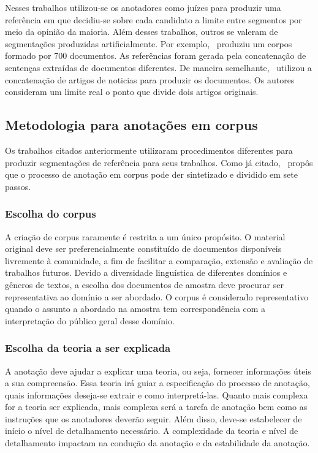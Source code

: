 Nesses trabalhos utilizou-se os anotadores como juízes para produzir uma referência em que decidiu-se sobre cada candidato a limite entre segmentos por meio da opinião da maioria. Além desses trabalhos, outros se valeram de segmentações produzidas artificialmente. Por exemplo,~\cite{Choi2000} produziu um corpos formado por 700 documentos. As referências foram gerada pela concatenação de sentenças extraídas de documentos diferentes. De maneira semelhante,~\cite{CHAIBI2014} utilizou a concatenação de artigos de noticias para produzir os documentos. Os autores consideram um limite real o ponto que divide dois artigos originais. 

\subsection{Metodologia para anotações em corpus}


Os trabalhos citados anteriormente utilizaram procedimentos diferentes para produzir segmentações de referência para seus trabalhos. Como já citado,~\cite{Hovy2010} propôs que o processo de anotação em corpus pode der sintetizado e dividido em sete passos. 


\subsubsection{Escolha do corpus}
A criação de corpus raramente é restrita a um único propósito. O material original deve ser preferencialmente constituído de documentos disponíveis livremente à comunidade, a fim de facilitar a comparação, extensão e avaliação de trabalhos futuros. 
Devido a diversidade linguística de diferentes domínios e gêneros de textos, a escolha dos documentos de amostra deve procurar ser representativa ao domínio a ser abordado. O corpus é considerado representativo quando o assunto a abordado na amostra tem correspondência com a interpretação do público geral desse domínio.

\subsubsection{Escolha da teoria a ser explicada}
A anotação deve ajudar a explicar uma teoria, ou seja, fornecer informações úteis a sua compreensão. Essa teoria irá guiar a especificação do processo de anotação, quais informações deseja-se extrair e como interpretá-las. Quanto mais complexa for a teoria ser explicada, mais complexa será a tarefa de anotação bem como as instruções que os anotadores deverão seguir. Além disso, deve-se estabelecer de início o nível de detalhamento necessário. 
A complexidade da teoria e nível de detalhamento impactam na condução da anotação e da estabilidade da anotação.

